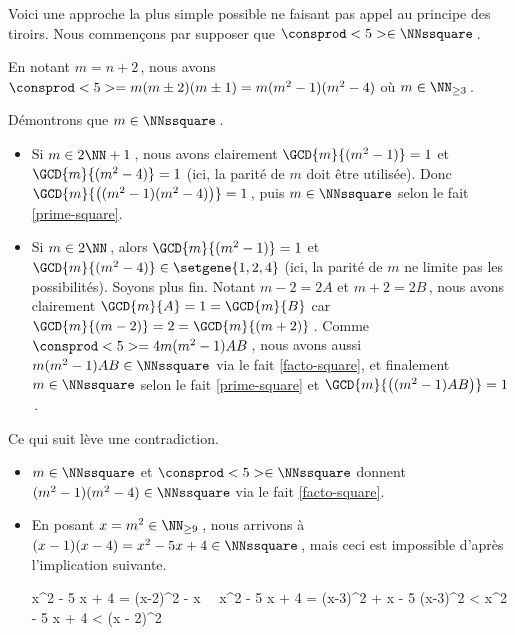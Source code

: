 Voici une approche la plus simple possible ne faisant pas appel au principe des tiroirs.
Nous commençons par supposer que $\consprod<5> \in \NNssquare$\,.
    
\smallskip

En notant $m = n+2$\,, nous avons $\consprod<5> = m (m \pm 2) (m \pm 1) = m (m^2 - 1) (m^2 - 4)$ où $m \in \NN_{\geq 3}$\,.

\medskip

Démontrons que $m \in \NNssquare$\,.
%	
\begin{itemize}
	\item Si $m \in 2 \NN + 1$\,, nous avons clairement $\GCD{m}{(m^2 - 1)} = 1$ et $\GCD{m}{(m^2 - 4)} = 1$ (ici, la parité de $m$ doit être utilisée).
	Donc $\GCD{m}{\big( (m^2 - 1) (m^2 - 4) \big)} = 1$\,, puis $m \in \NNssquare$ selon le fait \ref{prime-square}.


	\item Si $m \in 2 \NN$\,, alors $\GCD{m}{(m^2 - 1)} = 1$ et $\GCD{m}{(m^2 - 4)} \in \setgene{1, 2, 4}$ (ici, la parité de $m$ ne limite pas les possibilités). Soyons plus fin.
	Notant $m - 2 = 2A$ et $m + 2 = 2B$\,, nous avons clairement $\GCD{m}{A} = 1 = \GCD{m}{B}$ car $\GCD{m}{(m - 2)} = 2 = \GCD{m}{(m + 2)}$\,.
	Comme $\consprod<5> = 4 m (m^2 - 1) A B$\,, nous avons aussi $m (m^2 - 1) A B \in \NNssquare$ via le fait \ref{facto-square}, et finalement $m \in \NNssquare$ selon le fait \ref{prime-square} et $\GCD{m}{\big( (m^2 - 1) A B \big)} = 1$\,. 
\end{itemize}

\medskip

Ce qui suit lève une contradiction.
%	
\begin{itemize}
	\item $m \in \NNssquare$ et $\consprod<5> \in \NNssquare$ donnent $(m^2 - 1) (m^2 - 4) \in \NNssquare$ via le fait \ref{facto-square}. 

	\item En posant $x = m^2 \in \NN_{\geq 9}$\,, nous arrivons à $(x - 1) (x - 4) = x^2 - 5 x + 4 \in \NNssquare$\,, mais ceci est impossible d'après l'implication suivante.
	
	\medskip	
	\noindent\kern-10pt%
	\begin{stepcalc}[style=ar*, ope={\implies}]
		x^2 - 5 x + 4 = (x-2)^2 - x
		\,\,\,\,
		x^2 - 5 x + 4 = (x-3)^2 + x - 5
		(x-3)^2 < x^2 - 5 x + 4 < (x - 2)^2
	\end{stepcalc}
\end{itemize}

\vspace{-1.5ex}
\qedhere